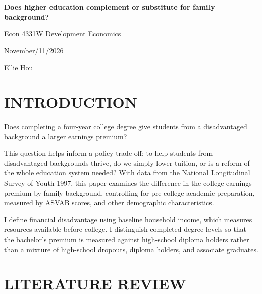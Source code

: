 \documentclass[12pt,letterpaper]{article}
\begin{document}
\hypersetup{pageanchor=false}
\begin{titlepage}
    \centering
    \singlespacing
    \vspace*{1.5in}

    {\bfseries Does higher education complement or substitute for family background?\par}
    \vspace{\baselineskip}
    Econ 4331W Development Economics\par
    November/11/2026\par
    Ellie Hou\par

    \vfill
\end{titlepage}
\hypersetup{pageanchor=true}

\doublespacing
\raggedright

\section*{INTRODUCTION}
Does completing a four-year college degree give students from a disadvantaged background a
larger earnings premium? 


This question helps inform a policy trade-off: to help students from
disadvantaged backgrounds thrive, do we simply lower tuition, or is a reform of the whole
education system needed? With data from the National Longitudinal Survey of Youth 1997,
this paper examines the difference in the college earnings premium by family background,
controlling for pre-college academic preparation, measured by ASVAB scores, and other
demographic characteristics.

I define financial disadvantage using baseline household income, which measures
resources available before college. I distinguish completed degree levels so that
the bachelor's premium is measured against high-school diploma holders rather
than a mixture of high-school dropouts, diploma holders, and associate graduates.


\section*{LITERATURE REVIEW}
\end{document}
